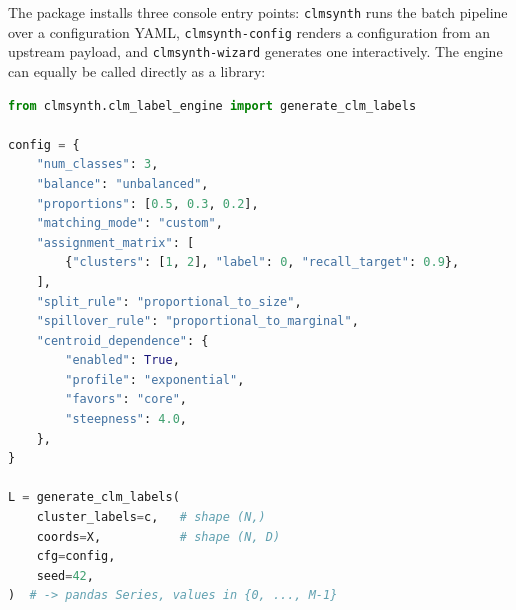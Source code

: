 \documentclass[a4paper,12pt]{article}
\begin{document}
\noindent The package installs three console entry points: \texttt{clmsynth} runs the batch pipeline over a configuration YAML, \texttt{clmsynth-config} renders a configuration from an upstream payload, and \texttt{clmsynth-wizard} generates one interactively. The engine can equally be called directly as a library:
\begin{lstlisting}[language=Python]
from clmsynth.clm_label_engine import generate_clm_labels

config = {
    "num_classes": 3,
    "balance": "unbalanced",
    "proportions": [0.5, 0.3, 0.2],
    "matching_mode": "custom",
    "assignment_matrix": [
        {"clusters": [1, 2], "label": 0, "recall_target": 0.9},
    ],
    "split_rule": "proportional_to_size",
    "spillover_rule": "proportional_to_marginal",
    "centroid_dependence": {
        "enabled": True,
        "profile": "exponential",
        "favors": "core",
        "steepness": 4.0,
    },
}

L = generate_clm_labels(
    cluster_labels=c,   # shape (N,)
    coords=X,           # shape (N, D)
    cfg=config,
    seed=42,
)  # -> pandas Series, values in {0, ..., M-1}
\end{lstlisting}
\end{document}
